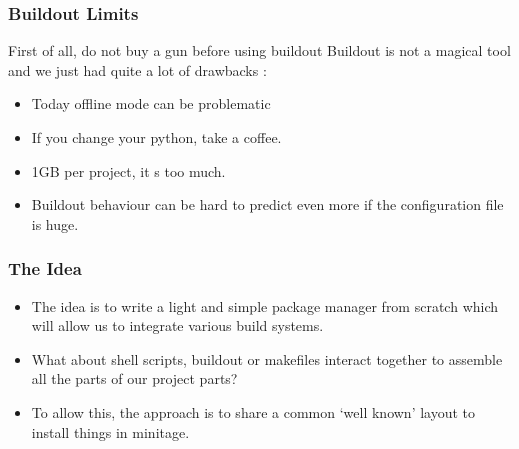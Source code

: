\documentclass[letterpaper,10pt,english]{sphinxmanual}
\begin{document}
\subsubsection{Buildout Limits}
\label{about:buildout-limits}
First of all, do not buy a gun before using buildout
Buildout is not a magical tool and we just had quite a lot of drawbacks :
\begin{itemize}
\item {} 
Today offline mode can be problematic

\item {} 
If you change your python, take a coffee.

\item {} 
1GB per project, it s too much.

\item {} 
Buildout behaviour can be hard to predict even more if the configuration file is huge.

\end{itemize}


\subsubsection{The Idea}
\label{about:the-idea}\begin{itemize}
\item {} 
The idea is to write a light and simple package manager from scratch which will allow us to integrate various build systems.

\item {} 
What about shell scripts, buildout or makefiles interact together to assemble all the parts of our project parts?

\item {} 
To allow this, the approach is to share a common `well known' layout to install things in minitage.

\end{itemize}
\end{document}
